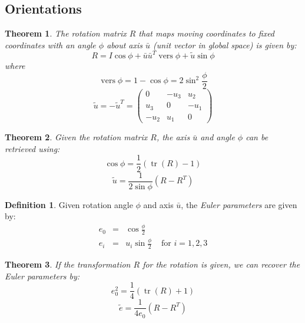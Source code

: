 \documentclass{article}
\newtheorem{theorem}{Theorem}[section]
\theoremstyle{definition}
\newtheorem{definition}{Definition}[section]
\DeclareMathOperator{\vers}{vers}
\DeclareMathOperator{\tr}{tr}
\begin{document}
\subsection{Orientations}
\begin{theorem}
The rotation matrix $R$ that maps moving coordinates to fixed coordinates with an angle $\phi$ about axis $\bar{u}$ (unit vector in global space) is given by:\newline
\begin{equation*}
R = I \cos \phi + \bar{u}\bar{u}^T \vers \phi + \tilde{u} \sin \phi
\end{equation*}
where
\begin{equation*}
\vers \phi = 1 - \cos \phi = 2 \sin^2 \frac{\phi}{2}
\end{equation*}
\begin{equation*}
\tilde{u} = -\tilde{u}^T = \begin{pmatrix}
0 & -u_3 & u_2 \\
u_3 & 0 & -u_1 \\
-u_2 & u_1 & 0
\end{pmatrix}
\end{equation*}
\end{theorem}

\begin{theorem}
Given the rotation matrix $R$, the axis $\bar{u}$ and angle $\phi$ can be retrieved using:
\begin{equation*}
\cos \phi = \frac{1}{2}(\tr(R) - 1)
\end{equation*}
\begin{equation*}
\tilde{u} = \frac{1}{2 \sin \phi}(R - R^T)
\end{equation*}
\end{theorem}

\begin{definition}
Given rotation angle $\phi$ and axis $\bar{u}$, the \emph{Euler parameters} are given by:
\begin{equation*}
\begin{array}{lclr}
e_0 & = & \cos \frac{\phi}{2} & \\
e_i & = & u_i \sin \frac{\phi}{2} & \mbox{ for } i = 1, 2, 3
\end{array}
\end{equation*}
\end{definition}

\begin{theorem}
If the transformation $R$ for the rotation is given, we can recover the Euler parameters by:
\begin{equation*}
e_0^2 = \frac{1}{4}(\tr(R) + 1)
\end{equation*}
\begin{equation*}
\tilde{e} = \frac{1}{4e_0}(R - R^T)
\end{equation*}
\end{theorem}
\end{document}
